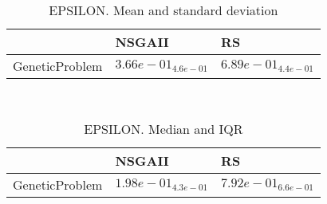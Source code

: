 \documentclass{article}
\begin{document}
\
\begin{table}
\caption{EPSILON. Mean and standard deviation}
\label{table:mean.EPSILON}
\centering
\begin{scriptsize}
\begin{tabular}{lll}
\hline & NSGAII &  RS\\
\hline
GeneticProblem & \cellcolor{gray95}$  3.66e-01_{ 4.6e-01}$ & $  6.89e-01_{ 4.4e-01}$ \\
\hline
\end{tabular}
\end{scriptsize}
\end{table}
\
\begin{table}
\caption{EPSILON. Median and IQR}
\label{table:median.EPSILON}
\begin{scriptsize}
\centering
\begin{tabular}{lll}
\hline & NSGAII &  RS\\
\hline
GeneticProblem & \cellcolor{gray95}$  1.98e-01_{ 4.3e-01}$ & $  7.92e-01_{ 6.6e-01}$ \\
\hline
\end{tabular}
\end{scriptsize}
\end{table}
\end{document}
